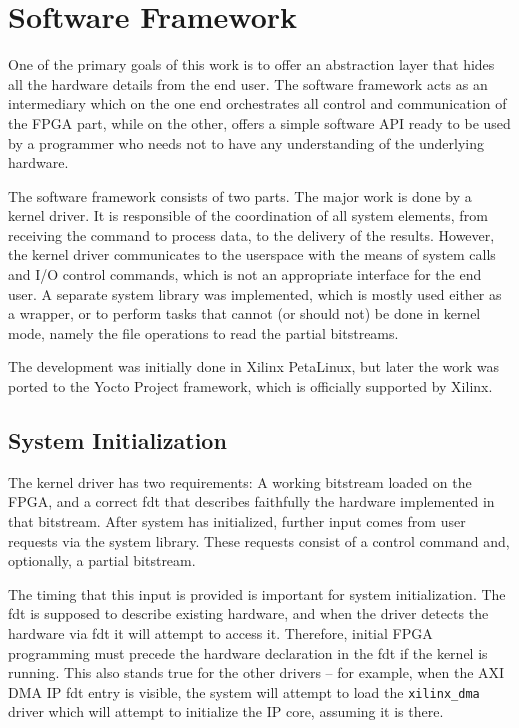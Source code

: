 \chapter{Software Framework}

One of the primary goals of this work is to offer an abstraction layer that hides
all the hardware details from the end user. The software framework acts as an intermediary
which on the one end orchestrates all control and communication of the FPGA part, while
on the other, offers a simple software API ready to be used by a programmer who needs not
to have any understanding of the underlying hardware.

The software framework consists of two parts. The major work is done by a kernel driver.
It is responsible of the coordination of all system elements, from receiving the command
to process data, to the delivery of the results. However, the kernel driver communicates
to the userspace with the means of system calls and I/O control commands, which is not
an appropriate interface for the end user. A separate system library was implemented,
which is mostly used either as a wrapper, or to perform tasks that cannot (or should not)
be done in kernel mode, namely the file operations to read the partial bitstreams.

The development was initially done in Xilinx PetaLinux, but later the work was
ported to the Yocto Project framework, which is officially supported by Xilinx.

\section{System Initialization}

The kernel driver has two requirements: A working bitstream loaded on the FPGA,
and a correct \gls{fdt} that describes faithfully the hardware implemented in that bitstream.
After system has initialized, further input comes from user requests via the system library.
These requests consist of a control command and, optionally, a partial bitstream.

The timing that this input is provided is important for system initialization.
The \gls{fdt} is supposed to describe existing hardware, 
and when the driver detects the hardware via \gls{fdt} it will attempt to access it.
Therefore, initial FPGA programming must precede the hardware declaration in the \gls{fdt}
if the kernel is running. This also stands true for the other drivers -- for example,
when the AXI DMA IP \gls{fdt} entry is visible, the system will attempt to load the \texttt{xilinx\_dma}
driver which will attempt to initialize the IP core, assuming it is there.

